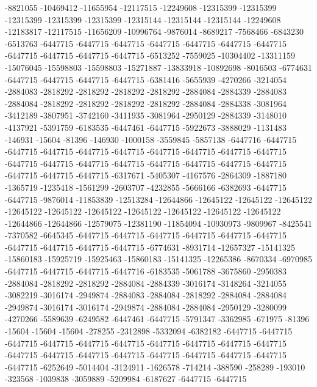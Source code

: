 -8821055 -10469412 -11655954 -12117515 -12249608 -12315399 -12315399 -12315399 -12315399 -12315399 -12315144 -12315144 -12315144 -12249608 -12183817 -12117515 -11656209 -10996764 -9876014 -8689217 -7568466 -6843230 -6513763 -6447715 -6447715 -6447715 -6447715 -6447715 -6447715 -6447715 -6447715 -6447715 -6447715 -6447715 -6513252 -7559025 -10304402 -13311159 -15076045 -15598803 -15598803 -15271887 -13833918 -10892698 -8016503 -6774631 -6447715 -6447715 -6447715 -6447715 -6381416 -5655939 -4270266 -3214054 -2884083 -2818292 -2818292 -2818292 -2818292 -2884084 -2884339 -2884083 -2884084 -2818292 -2818292 -2818292 -2818292 -2884084 -2884338 -3081964 -3412189 -3807951 -3742160 -3411935 -3081964 -2950129 -2884339 -3148010 -4137921 -5391759 -6183535 -6447461 -6447715 -5922673 -3888029 -1131483 -146931 -15604 -81396 -146930 -1000158 -3559845 -5857138 -6447716 -6447715 -6447715 -6447715 -6447715 -6447715 -6447715 -6447715 -6447715 -6447715 -6447715 -6447715 -6447715 -6447715 -6447715 -6447715 -6447715 -6447715 -6447715 -6447715 -6447715 -6317671 -5405307 -4167576 -2864309 -1887180 -1365719 -1235418 -1561299 -2603707 -4232855 -5666166 -6382693 -6447715 -6447715
-9876014 -11853839 -12513284 -12644866 -12645122 -12645122 -12645122 -12645122 -12645122 -12645122 -12645122 -12645122 -12645122 -12645122 -12644866 -12644866 -12579075 -12381190 -11854094 -10930973 -9809967 -8425541 -7370582 -6645345 -6447715 -6447715 -6447715 -6447715 -6447715 -6447715 -6447715 -6447715 -6447715 -6447715 -6774631 -8931714 -12657327 -15141325 -15860183 -15925719 -15925463 -15860183 -15141325 -12265386 -8670334 -6970985 -6447715 -6447715 -6447715 -6447716 -6183535 -5061788 -3675860 -2950383 -2884084 -2818292 -2818292 -2884084 -2884339 -3016174 -3148264 -3214055 -3082219 -3016174 -2949874 -2884083 -2884084 -2818292 -2884084 -2884084 -2949874 -3016174 -3016174 -2949874 -2884084 -2884084 -2950129 -3280099 -4270266 -5589639 -6249582 -6447461 -6447715 -5791347 -3362985 -671975 -81396 -15604 -15604 -15604 -278255 -2312898 -5332094 -6382182 -6447715 -6447715 -6447715 -6447715 -6447715 -6447715 -6447715 -6447715 -6447715 -6447715 -6447715 -6447715 -6447715 -6447715 -6447715 -6447715 -6447715 -6447715 -6447715 -6252649 -5014404 -3124911 -1626578 -714214 -388590 -258289 -193010 -323568 -1039838 -3059889 -5209984 -6187627 -6447715 -6447715
